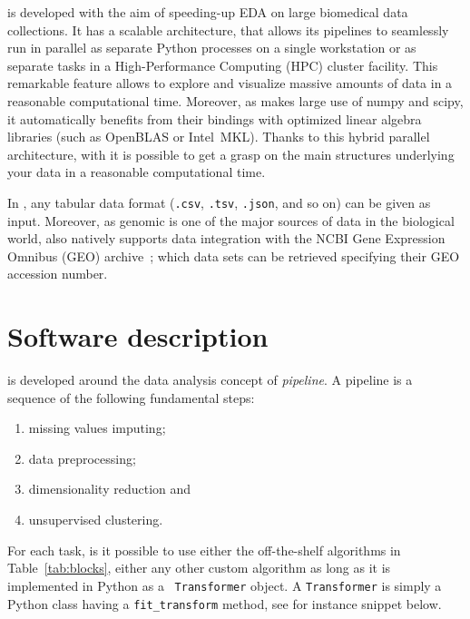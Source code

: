 \ade is developed with the aim of speeding-up EDA on large biomedical data collections.
It has a scalable architecture, that allows its pipelines to seamlessly run in parallel as separate Python processes on a single workstation or as 
separate tasks in a High-Performance Computing (HPC) cluster facility. This remarkable feature allows to explore and visualize massive amounts of data in a reasonable computational time.
Moreover, as \ade makes large use of {\sc numpy} and {\sc scipy}, it automatically benefits from their bindings with optimized linear algebra libraries (such as OpenBLAS or Intel\textsuperscript{\textregistered}~MKL).
Thanks to this hybrid parallel architecture, with \ade it is possible to get a grasp on the main structures underlying your data in a reasonable computational time.

In \ade, any tabular data format ({\tt .csv}, {\tt .tsv}, {\tt .json}, and so on) can be given as input. Moreover, as genomic is one of the major sources of data in the biological world, \ade also natively supports data integration with the NCBI Gene Expression Omnibus (GEO) archive~\cite{barrett2013ncbi}; which data sets can be retrieved specifying their GEO accession number.


\section{Software description} \label{sec:adenine_implementation}
\ade is developed around the data analysis concept of \emph{pipeline}. A pipeline is a sequence of the following fundamental steps:
\begin{enumerate}
  \item missing values imputing;
  \item data preprocessing;
  \item dimensionality reduction and
  \item unsupervised clustering.
\end{enumerate}
For each task, is it possible to use either the off-the-shelf algorithms in Table~\ref{tab:blocks}, either any other custom algorithm as long as it is implemented in Python as a \sklearn~{\tt Transformer} object. A {\tt Transformer} is simply a Python class having a {\tt fit\_transform} method, see for instance snippet below.

